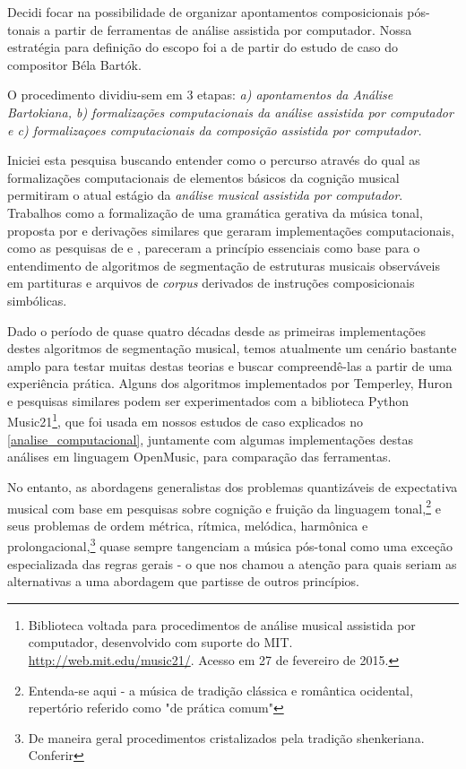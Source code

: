 \documentclass[
	12pt,				%
	openright,			%
	twoside,			%
	a4paper,			%
	english,			%
	french,				%
	spanish,			%
	brazil				%
	]{abntex2}
\begin{document}
Decidi focar na possibilidade de organizar apontamentos composicionais pós-tonais a partir de ferramentas de análise assistida por computador. Nossa estratégia para definição do escopo foi a de partir do estudo de caso do compositor Béla Bartók.

O procedimento dividiu-sem em 3 etapas:\textit{ a) apontamentos da Análise Bartokiana, b) formalizações computacionais da análise assistida por computador e c) formalizaçoes computacionais da composição assistida por computador.}


Iniciei esta pesquisa buscando entender como o percurso através do qual as formalizações computacionais de elementos básicos da cognição musical permitiram o atual estágio da \textit{análise musical assistida por computador}. Trabalhos como a formalização de uma gramática gerativa da música tonal, proposta por  e derivações similares que geraram implementações computacionais, como as pesquisas de  e , pareceram a princípio essenciais como base para o entendimento de algoritmos de segmentação de estruturas musicais observáveis em partituras e arquivos de \textit{corpus} derivados de instruções composicionais simbólicas.

Dado o período de quase quatro décadas desde as primeiras implementações destes algoritmos de segmentação musical, temos atualmente um cenário bastante amplo para testar muitas destas teorias e buscar compreendê-las a partir de uma experiência prática. Alguns dos algoritmos implementados por Temperley, Huron e pesquisas similares podem ser experimentados com a biblioteca Python Music21\footnote{Biblioteca voltada para procedimentos de análise musical assistida por computador, desenvolvido com suporte do MIT. \url{http://web.mit.edu/music21/}. Acesso em 27 de fevereiro de 2015.}, que foi usada em nossos estudos de caso explicados no \autoref{analise_computacional}, juntamente com algumas implementações destas análises em linguagem OpenMusic, para comparação das ferramentas.

No entanto, as abordagens generalistas dos problemas quantizáveis de expectativa musical com base em pesquisas sobre cognição e fruição da linguagem tonal,\footnote{ Entenda-se aqui - a música de tradição clássica e romântica ocidental, repertório referido como "de prática comum"\cite{temperley2001cognition} } e seus problemas de ordem métrica, rítmica, melódica, harmônica e prolongacional,\footnote{De maneira geral procedimentos cristalizados pela tradição shenkeriana. Conferir  } quase sempre tangenciam a música pós-tonal como uma exceção especializada das regras gerais - o que nos chamou a atenção para quais seriam as alternativas a uma abordagem que partisse de outros princípios. 
\end{document}
